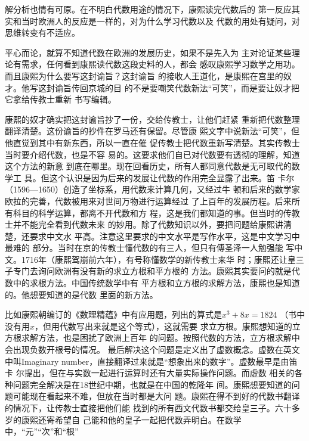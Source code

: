 解分析也情有可原。在不明白代数用途的情况下，康熙读完代数后的%
第一反应其实和当时欧洲人的反应是一样的，对为什么学习代数以及%
代数的用处有疑问，对思维转变有不适应。%
\par
平心而论，就算不知道代数在欧洲的发展历史，如果不是先入为%
主对论证某些理论有需求，任何看到康熙读代数这段史料的人，都会%
感叹康熙学习数学之用功。而且康熙为什么要写这封谕旨？这封谕旨%
的接收人王道化，是康熙在宫里的奴才。他写这封谕旨传回京城的目%
的不是要嘲笑代数新法“可笑”，而是要让奴才把它拿给传教士重新%
书写编辑。%
\par
康熙的奴才确实把这封谕旨抄了一份，交给传教士，让他们赶紧%
重新把代数整理翻译清楚。这份谕旨的抄件在罗马还有保留。尽管康%
熙文字中说新法“可笑”，但他直觉到其中有新东西，所以一直在催%
促传教士把代数重新写清楚。其实传教士当时要介绍代数，也是不容%
易的。这要求他们自已对代数要有透彻的理解，知道这个方法的新意%
到底在哪里。现在回看历史，所有人都同意代数是无可取代的数学工%
具。但这个认识是因为后来的发展让代数的作用完全显露了出来。笛%
卡尔（1596—1650）创造了坐标系，用代数来计算几何，又经过牛%
顿和后来的数学家欧拉的完善，代数被用来对世间万物进行运算经过%
了上百年的发展历程。后来所有科目的科学运算，都离不开代数和方%
程，这是我们都知道的事。但当时的传教士并不能完全看到代数未来%
的妙用。除了代数知识以外，要把问题给康熙讲清楚，还要求中文水%
平高。注意这里要求的中文水平是写作水平，这是中文学习中最难的%
部分。当时在京的传教士懂代数的有三人，但只有傅圣泽一人勉强能%
写中文。1716年（康熙驾崩前六年），有号称懂数学的新传教士来华%
时；康熙还让皇三子专门去询问欧洲有没有新的求立方根和平方根的%
方法。康熙其实要问的就是代数中的求根方法。中国传统数学中有%
平方根和立方根的求解方法，康熙也是知道的。他想要知道的是代数%
里面的新方法。%
\par
比如康熙朝编订的《数理精蕴》中有应用题，列出的算式是\(x^3+8x=1824\)%
（书中没有用\(x\)，但用代数写出来就是这个等式），这就需要%
求立方根。康熙想知道的立方根求解方法，也是困扰了欧洲上百年%
的问题。按照代数的方法，立方根求解中会出现负数开根号的情况。%
最后解决这个问题是定义出了虚数概念。虚数在英文中叫Imaginary%
\space%
number，直接翻译过来就是“想象出来的数字”。虚数最早是由笛卡%
尔提出，但在与实数一起进行运算时还有大量实际操作问题。而虚数%
相关的各种问题完全解决是在18世纪中期，也就是在中国的乾隆年%
间。康熙想要知道的问题可能现在看起来不难，但放在当时都是大问%
题。康熙在得不到好的代数书翻译的情况下，让传教士直接把他们能%
找到的所有西文代数书都交给皇三子。六十多岁的康熙还寄希望自%
己能和他的皇子一起把代数弄明白。在数学中，“元”“次”和“根”%
